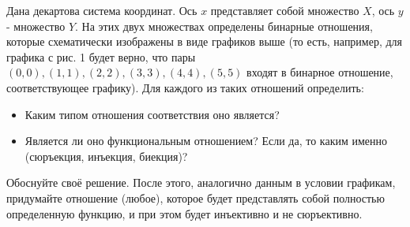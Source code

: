 \question
Дана декартова система координат. Ось $x$ представляет собой множество $X$, ось $y$ - множество $Y$. На этих двух множествах определены бинарные отношения, которые схематически изображены в виде графиков выше (то есть, например, для графика с рис. 1 будет верно, что пары $(0, 0), (1, 1), (2, 2), (3, 3), (4, 4), (5, 5)$ входят в бинарное отношение, соответствующее графику). Для каждого из таких отношений определить:
\begin{itemize}
    \item Каким типом отношения соответствия оно является?
    \item Является ли оно функциональным отношением? Если да, то каким именно (сюръекция, инъекция, биекция)?
\end{itemize}
Обоснуйте своё решение. После этого, аналогично данным в условии графикам, придумайте отношение (любое), которое будет представлять собой полностью определенную функцию, и при этом будет инъективно и не сюръективно.
\\

